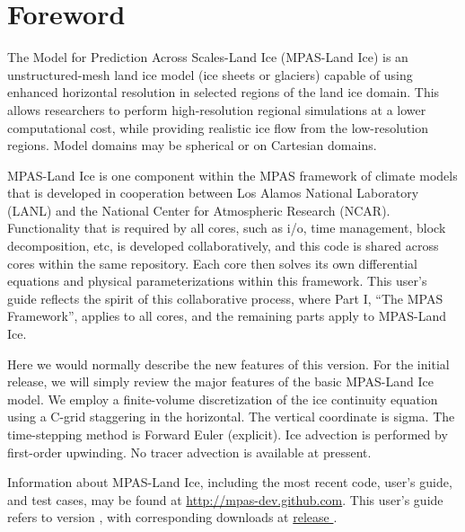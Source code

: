 \chapter*{Foreword}
\label{chap:foreword}

The Model for Prediction Across Scales-Land Ice (MPAS-Land Ice) is an unstructured-mesh land ice model (ice sheets or glaciers) capable of using enhanced horizontal resolution in selected regions of the land ice domain.  This allows researchers to perform high-resolution regional simulations at a lower computational cost, while providing realistic ice flow from the low-resolution regions. Model domains may be spherical or on Cartesian domains.  

MPAS-Land Ice is one component within the MPAS framework of climate models that is developed in cooperation between Los Alamos National Laboratory (LANL) and the National Center for Atmospheric Research (NCAR).  Functionality that is required by all cores, such as i/o, time management, block decomposition, etc, is developed collaboratively, and this code is shared across cores within the same repository.  Each core then solves its own differential equations and physical parameterizations within this framework.  This user's guide reflects the spirit of this collaborative process, where Part I, ``The MPAS Framework'', applies to all cores, and the remaining parts apply to MPAS-Land Ice.

Here we would normally describe the new features of this version.  For the initial release, we will simply review the major features of the basic MPAS-Land Ice model.  We employ a finite-volume discretization of the ice continuity equation using a C-grid staggering in the horizontal.  The vertical coordinate is sigma.  The time-stepping method is Forward Euler (explicit).  Ice advection is performed by first-order upwinding.  No tracer advection is available at pressent.  


Information about MPAS-Land Ice, including the most recent code, user's guide, and test cases, may be found at \url{http://mpas-dev.github.com}.  This user's guide refers to version \version, with corresponding downloads at \href{http://mpas-dev.github.com/landice/release_\version/release_\version.html}{release \version}. \\


